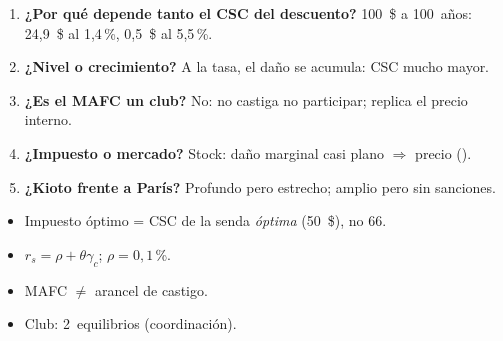 \documentclass{article}
\begin{document}
\begin{columnas}
%
\begin{enumerate}
\item \textbf{¿Por qué depende tanto el CSC del descuento?} 100~\$ a 100~años: 24,9~\$ al 1,4\,\%, 0,5~\$ al 5,5\,\%.
\item \textbf{¿Nivel o crecimiento?} A la tasa, el daño se acumula: CSC mucho mayor.
\item \textbf{¿Es el MAFC un club?} No: no castiga no participar; replica el precio interno.
\item \textbf{¿Impuesto o mercado?} Stock: daño marginal casi plano $\Rightarrow$ precio ().
\item \textbf{¿Kioto frente a París?} Profundo pero estrecho; amplio pero sin sanciones.
\end{enumerate}
\begin{trampa}
\begin{itemize}
\item Impuesto óptimo = CSC de la senda \emph{óptima} (50~\$), no 66.
\item $r_s=\rho+\theta\gamma_c$;  $\rho=0{,}1$\,\%.
\item MAFC $\neq$ arancel de castigo.
\item Club: 2~equilibrios (coordinación).
\end{itemize}
\end{trampa}

\end{columnas}
\end{document}

